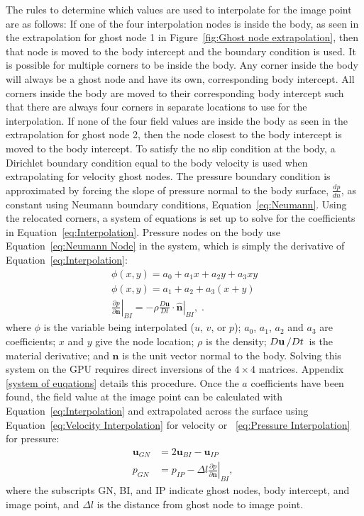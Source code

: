 The rules to determine which values are used to interpolate for the image point are as follows: 
If one of the four interpolation nodes is inside the body, as seen in the extrapolation for ghost node 1 in Figure~\ref{fig:Ghost node extrapolation}, then that node is moved to the body intercept and the boundary condition is used. 
It is possible for multiple corners to be inside the body. 
Any corner inside the body will always be a ghost node and have its own, corresponding body intercept. 
All corners inside the body are moved to their corresponding body intercept such that there are always four corners in separate locations to use for the interpolation. 
If none of the four field values are inside the body as seen in the extrapolation for ghost node 2, then the node closest to the body intercept is moved to the body intercept.
To satisfy the no slip condition at the body, a Dirichlet boundary condition equal to the body velocity is used when extrapolating for velocity ghost nodes. 
The pressure boundary condition is approximated by forcing the slope of pressure normal to the body surface, $\frac{dp}{dn}$, as constant using Neumann boundary conditions, Equation~\eqref{eq:Neumann}. 
Using the relocated corners, a system of equations is set up to solve for the coefficients in Equation~\eqref{eq:Interpolation}. 
Pressure nodes on the body use Equation~\eqref{eq:Neumann Node} in the system, which is simply the derivative of Equation~\eqref{eq:Interpolation}:
\begin{align}
\phi (x,y) = a_0 + a_1 x + a_2y + a_3 x y \label{eq:Interpolation} \\
\phi (x,y) = a_1 + a_2 + a_3 (x+y) \label{eq:Neumann Node} \\
\left. \frac{\partial p}{\partial \textbf{n}}\right|_{BI} = \left. -\rho \frac{D\textbf{u}}{Dt}\cdot \hat{\textbf{n}}\right|_{BI},
\label{eq:Neumann}\;.
\end{align}
where $\phi$ is the variable being interpolated ($u$, $v$, or $p$); $a_0$, $a_1$, $a_2$ and $a_3$ are coefficients; $x$ and $y$ give the node location;
$\rho$ is the density; $D\textbf{u}\left/Dt\right.$ is the material derivative; and $\textbf{n}$ is the unit vector normal to the body.
Solving this system on the GPU requires direct inversions of the $4 \times 4$ matrices. 
Appendix \ref{system of euqations} details this procedure. 
Once the $a$ coefficients have been found, the field value at the image point can be calculated with Equation~\eqref{eq:Interpolation} and extrapolated across the surface using Equation~\eqref{eq:Velocity Interpolation} for velocity or ~\eqref{eq:Pressure Interpolation} for pressure: 
\begin{align}
\textbf{u}_{GN} &= 2\textbf{u}_{BI} - \textbf{u}_{IP} \label{eq:Velocity Interpolation} \\
p_{GN} &= p_{IP} - \Delta l \left. \frac{\partial p}{\partial \textbf{n}}\right|_{BI}, \; \label{eq:Pressure Interpolation}
\end{align}
where the subscripts GN, BI, and IP indicate ghost nodes, body intercept, and image point, and $\Delta l$ is the distance from ghost node to image point.
